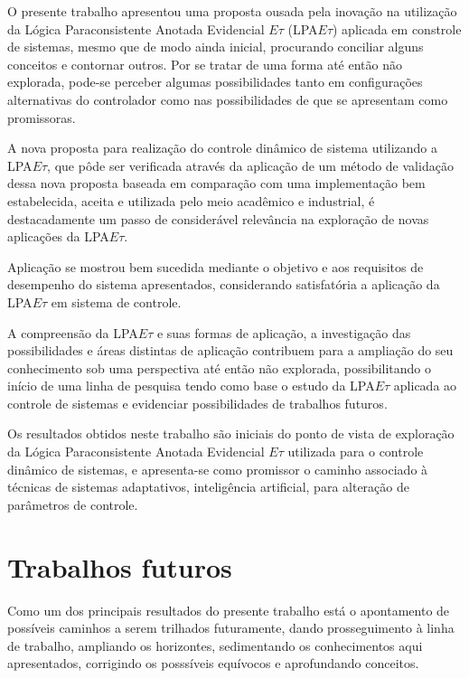 O presente trabalho apresentou uma
proposta ousada pela inovação na utilização da
Lógica Paraconsistente Anotada Evidencial $E\tau$
(LPA$E\tau$) aplicada em constrole de sistemas,
mesmo que de modo ainda inicial,
procurando conciliar
alguns conceitos e contornar outros.
Por se tratar de uma forma
até então não explorada,
pode-se perceber algumas possibilidades
tanto em configurações alternativas do
controlador como nas possibilidades de
que se apresentam como promissoras.

A nova proposta para realização do
controle dinâmico de sistema utilizando a
LPA$E\tau$,
que pôde ser verificada através da
aplicação de um método de validação
dessa nova proposta baseada em
comparação com uma implementação bem estabelecida,
aceita e utilizada pelo meio
acadêmico e industrial,
é destacadamente um passo de
considerável relevância na exploração de
novas aplicações da LPA$E\tau$.

Aplicação se mostrou bem sucedida mediante o objetivo e aos requisitos de desempenho do sistema apresentados, considerando satisfatória a aplicação da LPA$E\tau$ em sistema de controle.

A compreensão da LPA$E\tau$ e
suas formas de aplicação,
a investigação das possibilidades e
áreas distintas de aplicação
contribuem para a ampliação do
seu conhecimento sob uma perspectiva
até então não explorada,
possibilitando o início de
uma linha de pesquisa
tendo como base o estudo da LPA$E\tau$
aplicada ao controle de sistemas e
evidenciar possibilidades de trabalhos futuros.



Os resultados obtidos neste trabalho são iniciais do ponto de vista de exploração da Lógica Paraconsistente Anotada Evidencial $E\tau$ utilizada para o controle dinâmico de sistemas, e apresenta-se como promissor o caminho associado à técnicas de sistemas adaptativos, inteligência artificial, para alteração de parâmetros de controle.


\section{Trabalhos futuros}

Como um dos principais resultados do presente trabalho está o apontamento de possíveis caminhos a serem trilhados futuramente, dando prosseguimento à linha de trabalho, ampliando os horizontes, sedimentando os conhecimentos aqui apresentados, corrigindo os posssíveis equívocos e aprofundando conceitos.

